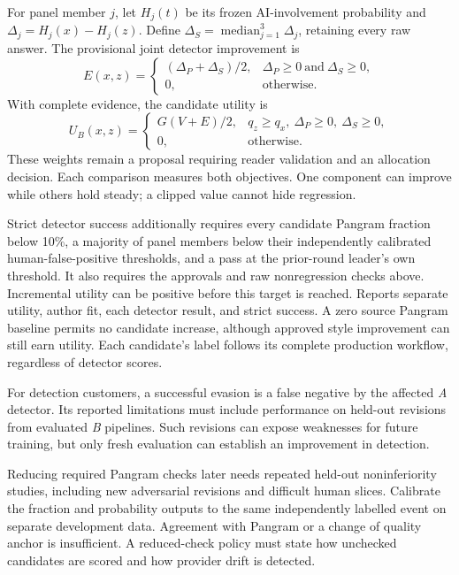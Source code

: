 For panel member \(j\), let \(H_j(t)\) be its frozen AI-involvement probability
and \(\Delta_j=H_j(x)-H_j(z)\). Define
\(\Delta_S=\operatorname{median}_{j=1}^{3}\Delta_j\), retaining every raw
answer. The provisional joint detector improvement is
\begin{equation}\label{eq:joint-evasion-utility}
 E(x,z)=\begin{cases}
 (\Delta_P+\Delta_S)/2,&\Delta_P\geq0\ \text{and}\ \Delta_S\geq0,\\
 0,&\text{otherwise}.
 \end{cases}
\end{equation}
With complete evidence, the candidate utility is
\begin{equation}\label{eq:transformation-utility}
 U_B(x,z)=\begin{cases}
 G(V+E)/2,&q_z\geq q_x,\ \Delta_P\geq0,\ \Delta_S\geq0,\\
 0,&\text{otherwise}.
 \end{cases}
\end{equation}
These weights remain a proposal requiring reader validation and an allocation
decision. Each comparison measures both objectives. One component can improve
while others hold steady; a clipped value cannot hide regression.

Strict detector success additionally requires every candidate Pangram fraction
below 10\%, a majority of panel members below their independently calibrated
human-false-positive thresholds, and a pass at the prior-round leader's own
threshold. It also requires the approvals and raw nonregression checks above.
Incremental utility can be positive before this target is reached. Reports
separate utility, author fit, each detector result, and strict success. A zero
source Pangram baseline permits no candidate increase, although approved style
improvement can still earn utility. Each candidate's label follows its complete
production workflow, regardless of detector scores.

For detection customers, a successful evasion is a false negative by the
affected \textit{A} detector. Its reported limitations must include performance
on held-out revisions from evaluated \textit{B} pipelines. Such revisions can
expose weaknesses for future training, but only fresh evaluation can establish
an improvement in detection.

Reducing required Pangram checks later needs repeated held-out noninferiority
studies, including new adversarial revisions and difficult human slices.
Calibrate the fraction and probability outputs to the same independently
labelled event on separate development data. Agreement with Pangram or a
change of quality anchor is insufficient. A reduced-check policy must state
how unchecked candidates are scored and how provider drift is detected.

